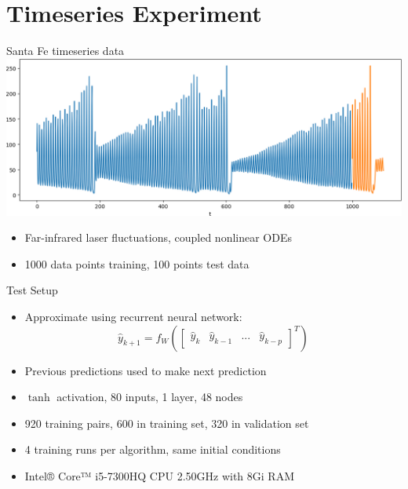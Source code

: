 \documentclass[11pt,t]{beamer}
\begin{document}
\section{Timeseries Experiment}
\begin{frame}[fragile]{Santa Fe timeseries data}
   	\centering
	\includegraphics[width=\textwidth]{santafe}
	\begin{itemize}
		\item Far-infrared laser fluctuations, coupled nonlinear ODEs
		\item 1000 data points training, 100 points test data
	\end{itemize}
\end{frame}
\begin{frame}[fragile]{Test Setup}
	\begin{itemize}
		\item Approximate using recurrent neural network:
		\begin{equation*}
		\hat{y}_{k+1} = f_W(\begin{bmatrix} \hat{y}_{k} & \hat{y}_{k-1} & ... & \hat{y}_{k-p}\end{bmatrix}^T)
		\end{equation*}
		\item Previous predictions used to make next prediction
		\item $\tanh$ activation, 80 inputs, 1 layer, 48 nodes
		\item 920 training pairs, 600 in training set, 320 in validation set
		\item 4 training runs per algorithm, same initial conditions
		\item Intel® Core™ i5-7300HQ CPU \@ 2.50GHz with 8Gi RAM
	\end{itemize}
\end{frame}
\end{document}
